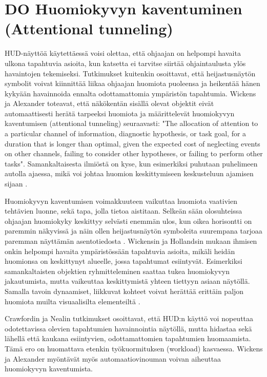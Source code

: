 \documentclass[utf8,bachelor,manualbib]{gradu3}
\begin{document}
\section{DO Huomiokyvyn kaventuminen (Attentional tunneling)}

HUD-näyttöä käytettäessä voisi olettaa, että ohjaajan on helpompi havaita ulkona tapahtuvia asioita, kun katsetta ei tarvitse siirtää ohjaintaulusta ylös havaintojen tekemiseksi. Tutkimukset \citep{crawfordneal2006} kuitenkin osoittavat, että heijastusnäytön symbolit voivat kiinnittää liikaa ohjaajan huomiota puoleensa ja heikentää hänen kykyään havainnoida ennalta odottamattomia ympäristön tapahtumia. Wickens ja Alexander \citeyearpar{wickensalexander2009} toteavat, että näkökentän sisällä olevat objektit eivät automaattisesti herätä tarpeeksi huomiota ja määrittelevät huomiokyvyn kaventumisen (attentional tunneling) seuraavasti: "The allocation of attention to a particular channel of information, diagnostic hypothesis, or task goal, for a duration that is longer than optimal, given the expected cost of neglecting events on other channels, failing to consider other hypotheses, or failing to perform other tasks". Samankaltaisesta ilmiöstä on kyse, kun esimerkiksi puhutaan puhelimeen autolla ajaessa, mikä voi johtaa huomion keskittymiseen keskusteluun ajamisen sijaan \citep{horreywickens2006, strayerdrews2007, strayerym2001}.

Huomiokyvyn kaventumisen voimakkuuteen vaikuttaa huomiota vaativien tehtävien luonne, sekä tapa, jolla tietoa aistitaan. Selkeän sään olosuhteissa ohjaajan huomiokyky keskittyy selvästi enemmän ulos, kun oikea horisontti on paremmin näkyvissä ja näin ollen heijastusnäytön symboleita suurempana tarjoaa paremman näyttämän asentotiedosta \citep{ververswickens1998}. Wickensin ja Hollandsin mukaan \citeyearpar{wickenshollands2000} ihmisen onkin helpompi havaita ympäristössään tapahtuvia asioita, mikäli heidän huomionsa on keskittynyt alueelle, jossa tapahtumat esiintyvät. Esimerkiksi samankaltaisten objektien ryhmitteleminen saattaa tukea huomiokyvyn jakautumista, mutta vaikeuttaa keskittymistä yhteen tiettyyn asiaan näytöllä. Samalla tavoin dynaamiset, liikkuvat kohteet voivat herättää erittäin paljon huomiota muilta visuaalisilta elementeiltä \citep{crawfordneal2006}.

Crawfordin ja Nealin \citeyearpar{crawfordneal2006} tutkimukset osoittavat, että HUD:n käyttö voi nopeuttaa odotettavissa olevien tapahtumien havainnointia näytöllä, mutta hidastaa sekä lähellä että kaukana esiintyvien, odottamattomien tapahtumien huomaamista. Tämä ero on huomattava etenkin työkuormituksen (workload) kasvaessa. Wickens ja Alexander \citeyearpar{wickensalexander2009} myöntävät myös automaatiovinouman \citep{mosierym1998} voivan aiheuttaa huomiokyvyn kaventumista.
\end{document}
